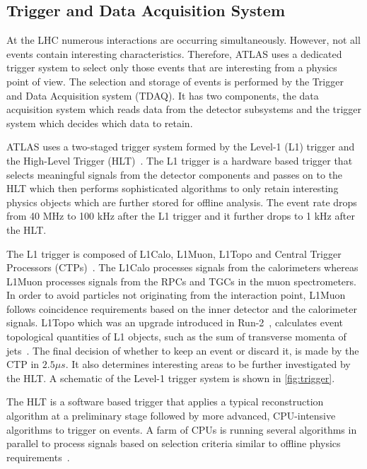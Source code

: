 \subsection{Trigger and Data Acquisition System}
At the LHC numerous interactions are occurring simultaneously. However, not all events contain
interesting characteristics. Therefore, ATLAS uses a dedicated trigger system to select only those
events that are interesting from a physics point of view. The selection and storage of events is 
performed by the Trigger and Data Acquisition system (TDAQ). It has two components, the data acquisition
system which reads data from the detector subsystems and the trigger system which decides which data 
to retain.
 
ATLAS uses a two-staged trigger system formed by the Level-1 (L1) trigger and the High-Level Trigger (HLT)~\cite{TRIG-2019-04}. The
L1 trigger is a hardware based trigger that selects meaningful signals from the detector components and passes on 
to the HLT which then performs sophisticated algorithms to only retain interesting physics objects 
which are further stored for offline analysis. The event rate drops from 40 MHz to 100 kHz after the L1 trigger and 
it further drops to 1 kHz after the HLT.

The L1 trigger is composed of L1Calo, L1Muon, L1Topo and Central Trigger 
Processors (CTPs)~\cite{Buttinger_2012}. The L1Calo processes signals from the calorimeters whereas 
L1Muon processes signals from the RPCs and TGCs in the
muon spectrometers. In order to avoid particles not originating from the interaction point, L1Muon 
follows coincidence requirements based on the inner detector and the calorimeter signals. L1Topo which 
was an upgrade introduced in Run-2~\cite{Simioni_2015}, calculates event topological quantities of L1 objects, such as the 
sum of transverse momenta of jets~\cite{Nakahama_2015}. The final decision of whether to keep an event 
or discard it, is made by the CTP in $2.5 \mu s$. It also determines interesting areas to be further 
investigated by the HLT. A schematic of the Level-1 trigger system is shown in \cref{fig:trigger}.

The HLT is a software based trigger that applies a typical reconstruction algorithm at a preliminary stage 
followed by more advanced, CPU-intensive algorithms to trigger on events. A farm of CPUs is running several
algorithms in parallel to process signals based on selection criteria similar to offline physics requirements~\cite{C-Gabaldon_2012}.   

